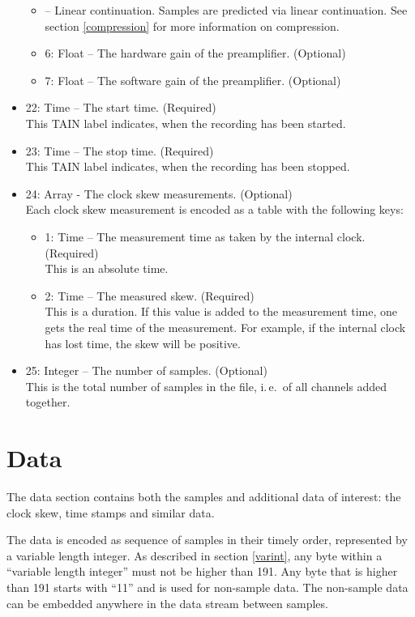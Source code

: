 \documentclass[DIV=10]{scrartcl}
\renewenvironment{quote}
{\list{}{
  \setlength{\rightmargin}{0cm}
  \setlength{\leftmargin}{0.75cm}}%
\item\relax\ignorespaces}
{\unskip\unskip\endlist}
\begin{document}
\begin{itemize}
\begin{itemize}
\begin{quote}
      2 – Linear continuation.
      Samples are predicted via linear continuation.
    \end{quote}
    See section \ref{compression} for more information on compression.
    \item 6: Float – The hardware gain of the preamplifier. (Optional)
    \item 7: Float – The software gain of the preamplifier. (Optional)
  \end{itemize}
  \item 22: Time – The start time. (Required)\\
  This TAIN label indicates, when the recording has been started.
  \item 23: Time – The stop time. (Required)\\
  This TAIN label indicates, when the recording has been stopped.
  \item 24: Array - The clock skew measurements. (Optional)\\
  Each clock skew measurement is encoded as a table with the following keys:
  \begin{itemize}
    \item 1: Time – The measurement time as taken by the internal clock. (Required)\\
    This is an absolute time.
    \item 2: Time – The measured skew. (Required)\\
    This is a duration.
    If this value is added to the measurement time, one gets the real time of the measurement.
    For example, if the internal clock has lost time, the skew will be positive.
  \end{itemize}
  \item 25: Integer – The number of samples. (Optional)\\
  This is the total number of samples in the file, i.\,e.\ of all channels added together.
\end{itemize}

\section{Data}


The data section contains both the samples and additional data of interest: the clock skew, time stamps and similar data.

The data is encoded as sequence of samples in their timely order, represented by a variable length integer. As described in section \ref{varint}, any byte within a “variable length integer” must not be higher than 191. Any byte that is higher than 191 starts with “11” and is used for non-sample data. The non-sample data can be embedded anywhere in the data stream between samples.
\end{document}
